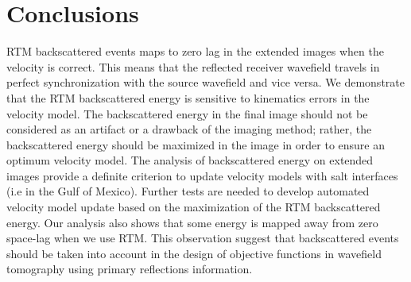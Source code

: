 \section{Conclusions}

RTM backscattered events maps to zero lag in the extended images when the
velocity is correct. This means that the reflected
receiver wavefield travels in perfect synchronization with the source wavefield and
vice versa. We demonstrate that the RTM backscattered energy is sensitive to kinematics errors
in the velocity model. The backscattered energy in the final image should not be considered 
as an artifact or a drawback of the imaging method; rather, the backscattered energy
 should be maximized in the image in order to ensure an optimum velocity 
model. The analysis of backscattered energy on extended images provide a definite criterion to update 
velocity models with salt interfaces (i.e in the Gulf of Mexico).
 Further tests are needed to develop automated velocity model update based on the maximization of 
the RTM backscattered energy. Our analysis also shows that some energy is mapped away from zero space-lag when
we use RTM. This observation suggest that backscattered events should be taken into account in the design 
of objective functions in wavefield tomography using primary reflections information.
